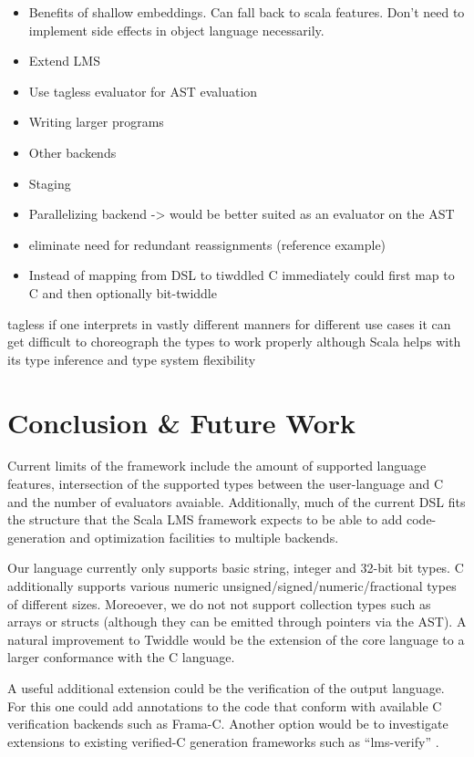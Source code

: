 \documentclass{article}
\begin{document}
\begin{itemize}
	\item Benefits of shallow embeddings. Can fall back to scala features. Don't need to implement side effects in object language necessarily.
	\item Extend LMS
	\item Use tagless evaluator for AST evaluation
	\item Writing larger programs
	\item Other backends
	\item Staging
	\item Parallelizing backend -> would be better suited as an evaluator on the AST
	\item eliminate need for redundant reassignments (reference example)
	\item Instead of mapping from DSL to tiwddled C immediately could first map to C and then optionally bit-twiddle
\end{itemize}

tagless if one interprets in vastly different manners for different use cases it can get difficult to choreograph the types to work properly although Scala helps with its type inference and type system flexibility
\section{Conclusion \& Future Work}
Current limits of the framework include the amount of supported language features, intersection of the supported types between the user-language and C and the number of evaluators avaiable. Additionally, much of the current DSL fits the structure
that the Scala LMS framework expects to be able to add code-generation and optimization facilities to multiple backends.

Our language currently only supports basic string, integer and 32-bit bit types. C additionally supports various numeric unsigned/signed/numeric/fractional types of different sizes. Moreoever, we do not not support collection types such as arrays or structs (although they can be emitted through pointers via the AST). A natural improvement to Twiddle would be the extension of the core language
to a larger conformance with the C language.

A useful additional extension could be the verification of the output language. For this one could add annotations to the code that conform with available C verification backends such as Frama-C. Another option would be to investigate extensions to existing verified-C generation frameworks such as ``lms-verify'' \cite{amin2017lms}.



\end{document}
